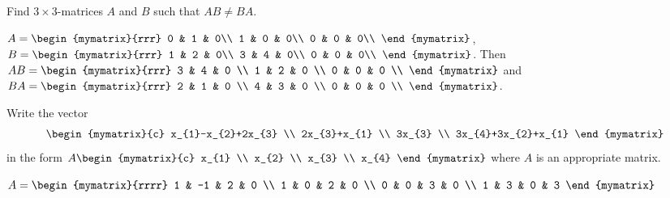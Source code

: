 \begin{enumialphparenastyle}
\begin{ex}
  Find $3 \times 3$-matrices $A$ and $B$ such that $AB \neq BA$.
  \begin{sol}
    $A = \begin{mymatrix}{rrr}
      0 & 1 & 0\\
      1 & 0 & 0\\
      0 & 0 & 0\\
    \end{mymatrix}$, $B = \begin{mymatrix}{rrr}
      1 & 2 & 0\\
      3 & 4 & 0\\
      0 & 0 & 0\\
    \end{mymatrix}$. Then 
    $AB=
    \begin{mymatrix}{rrr}
      3 & 4 & 0 \\
      1 & 2 & 0 \\
      0 & 0 & 0 \\
    \end{mymatrix}$ and $BA = 
    \begin{mymatrix}{rrr}
      2 & 1 & 0 \\
      4 & 3 & 0 \\
      0 & 0 & 0 \\
    \end{mymatrix}$.
  \end{sol}
\end{ex}

\begin{ex} Write the vector
  \begin{equation*}
    \begin{mymatrix}{c}
      x_{1}-x_{2}+2x_{3} \\
      2x_{3}+x_{1} \\
      3x_{3} \\
      3x_{4}+3x_{2}+x_{1}
    \end{mymatrix}
  \end{equation*}
  in the form $A\begin{mymatrix}{c}
    x_{1} \\
    x_{2} \\
    x_{3} \\
    x_{4}
  \end{mymatrix} $ where $A$ is an appropriate matrix.
  \begin{sol}
    $A=\begin{mymatrix}{rrrr}
      1 & -1 & 2 & 0 \\
      1 & 0 & 2 & 0 \\
      0 & 0 & 3 & 0 \\
      1 & 3 & 0 & 3
    \end{mymatrix} $
  \end{sol}
\end{ex}


\end{enumialphparenastyle}
